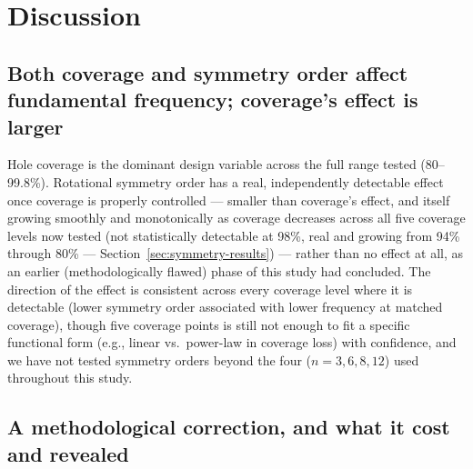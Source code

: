 \documentclass[11pt]{article}
\begin{document}
\section{Discussion}

\subsection{Both coverage and symmetry order affect fundamental frequency; coverage's effect is larger}

Hole coverage is the dominant design variable across the full range tested (80--99.8\%). Rotational symmetry order has a real, independently detectable effect once coverage is properly controlled --- smaller than coverage's effect, and itself growing smoothly and monotonically as coverage decreases across all five coverage levels now tested (not statistically detectable at 98\%, real and growing from 94\% through 80\% --- Section~\ref{sec:symmetry-results}) --- rather than no effect at all, as an earlier (methodologically flawed) phase of this study had concluded. The direction of the effect is consistent across every coverage level where it is detectable (lower symmetry order associated with lower frequency at matched coverage), though five coverage points is still not enough to fit a specific functional form (e.g., linear vs.\ power-law in coverage loss) with confidence, and we have not tested symmetry orders beyond the four ($n=3, 6, 8, 12$) used throughout this study.

\subsection{A methodological correction, and what it cost and revealed}
\label{sec:limitations-discussion}
\end{document}
